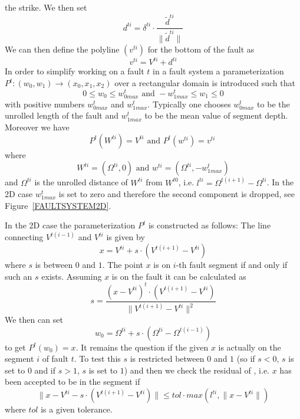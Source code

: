 the strike. We then set
\begin{equation}
d^{ti}=\delta^{ti} \cdot \frac{\tilde{d}^{ti}}{\|\tilde{d}^{ti}\|}
\label{eq:fault d}
\end{equation}
We can then define the polyline $(v^{ti})$ for the bottom of the fault as
\begin{equation}
v^{ti}= V^{ti}+d^{ti}
\label{eq:fault e}
\end{equation}
In order to simplify working on a fault $t$ in a fault system a
parameterization $P^t: (w_{0},w_{1}) \rightarrow (x_{0},x_{1},x_{2})$ over a
rectangular domain is introduced such that
\begin{equation}
0\le w_{0} \le w^t_{0 max} \mbox{ and }  -w^t_{1max}\le w_{1} \le 0
\label{eq:fault 1}
\end{equation}
with positive numbers $w^t_{0 max}$ and $w^t_{1 max}$. Typically one chooses
$w^t_{0 max}$ to be the unrolled length of the fault and $w^t_{1 max}$ to be
the mean value of segment depth. Moreover we have
\begin{equation}
P^t(W^{ti})=V^{ti}\mbox{ and } P^t(w^{ti})=v^{ti}\
\label{eq:fault 2}
\end{equation}
where
\begin{equation}
W^{ti}=(\Omega^{ti},0) \mbox{ and } w^{ti}=(\Omega^{ti},-w^t_{1 max})
\label{eq:fault 3}
\end{equation}
and $\Omega^{ti}$ is the unrolled distance of $W^{ti}$ from $W^{t0}$, i.e.
$l^{ti}=\Omega^{t(i+1)}-\Omega^{ti}$. In the 2D case $w^t_{1 max}$ is set to
zero and therefore the second component is dropped, see Figure~\ref{FAULTSYSTEM2D}.

In the 2D case the parameterization $P^t$ is constructed as follows:
The line connecting $V^{t(i-1)}$ and $V^{ti}$ is given by
\begin{equation}
x=V^{ti} + s  \cdot  ( V^{t(i+1)}- V^{ti} )
\label{eq:2D line 1}
\end{equation}
where $s$ is between $0$ and $1$. The point $x$ is on $i$-th fault segment if
and only if such an $s$ exists. Assuming $x$ is on the fault it can be
calculated as
\begin{equation}
s = \frac{ (x- V^{ti})^t \cdot (V^{t(i+1)}- V^{ti}) }{ \|V^{t(i+1)}- V^{ti}\|^2} 
\label{eq:2D line 1b}
\end{equation}
We then can set
\begin{equation}
w_{0}=\Omega^{ti}+s \cdot (\Omega^{ti}-\Omega^{t(i-1)})
\label{eq:2D line 2}
\end{equation}
to get $P^t(w_{0})=x$.
It remains the question if the given $x$ is actually on the segment $i$ of
fault $t$. To test this $s$ is restricted between $0$ and $1$ (so if $s<0$, $s$
is set to $0$ and if $s>1$, $s$ is set to $1$) and then we check the residual
of \eqn{eq:2D line 1}, i.e. $x$ has been accepted to be in the segment if
\begin{equation}
\|x-V^{ti} - s \cdot (V^{t(i+1)}- V^{ti}) \| \le tol \cdot  
max(l^{ti}, \|x-V^{ti} \|) 
\label{eq:2D line 3}
\end{equation}
where $tol$ is a given tolerance.

